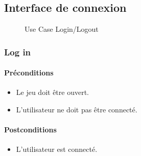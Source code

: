 \documentclass[a4paper,11pt]{report}
\begin{document}
\subsection{Interface de connexion}
\begin{figure}[ht]
    \caption{Use Case Login/Logout}
\end{figure}
\newpage
\subsubsection{Log in}
\paragraph{Préconditions}
\begin{itemize}
 \item Le jeu doit être ouvert.
 \item L'utilisateur ne doit pas être connecté.
\end{itemize}
\paragraph{Postconditions}
\begin{itemize}
 \item L'utilisateur est connecté.
\end{itemize}
\end{document}
